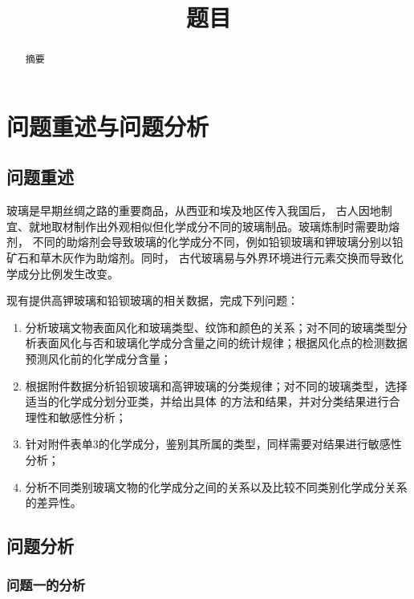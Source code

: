 \documentclass[withoutpreface,bwprint]{cumcmthesis} %
\title{题目}
\begin{document}
	
	\maketitle
	\begin{abstract}
		摘要
		
		
		\quad
		
		
\end{abstract}


\setcounter{page}{1}    

\section{问题重述与问题分析}
\subsection{问题重述}
玻璃是早期丝绸之路的重要商品，从西亚和埃及地区传入我国后， 古人因地制宜、就地取材制作出外观相似但化学成分不同的玻璃制品。玻璃炼制时需要助熔剂， 不同的助熔剂会导致玻璃的化学成分不同，例如铅钡玻璃和钾玻璃分别以铅矿石和草木灰作为助熔剂。同时， 古代玻璃易与外界环境进行元素交换而导致化学成分比例发生改变。


现有提供高钾玻璃和铅钡玻璃的相关数据，完成下列问题：


\begin{enumerate}
	\item 分析玻璃文物表面风化和玻璃类型、纹饰和颜色的关系；对不同的玻璃类型分析表面风化与否和玻璃化学成分含量之间的统计规律；根据风化点的检测数据预测风化前的化学成分含量；
	\item 根据附件数据分析铅钡玻璃和高钾玻璃的分类规律；对不同的玻璃类型，选择适当的化学成分划分亚类，并给出具体 的方法和结果，并对分类结果进行合理性和敏感性分析；
	\item 针对附件表单3的化学成分，鉴别其所属的类型，同样需要对结果进行敏感性分析；
	\item 分析不同类别玻璃文物的化学成分之间的关系以及比较不同类别化学成分关系的差异性。
\end{enumerate}


\subsection{问题分析}


\subsubsection{问题一的分析}
\end{document}
